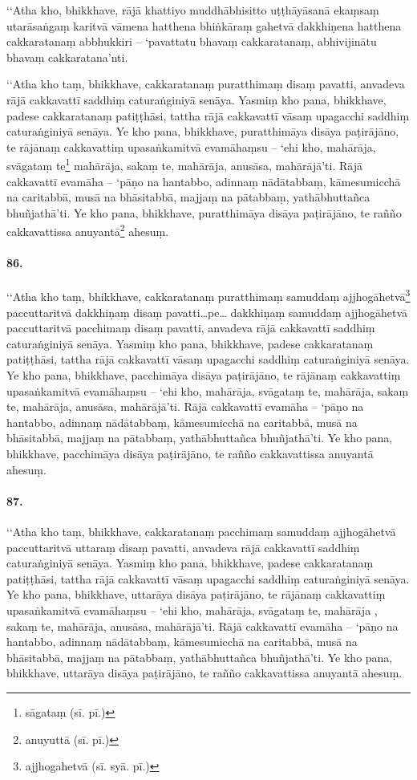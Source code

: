‘‘Atha kho, bhikkhave, rājā khattiyo muddhābhisitto uṭṭhāyāsanā ekaṃsaṃ utarāsaṅgaṃ karitvā vāmena hatthena bhiṅkāraṃ gahetvā dakkhiṇena hatthena cakkaratanaṃ abbhukkiri – ‘pavattatu bhavaṃ cakkaratanaṃ, abhivijinātu bhavaṃ cakkaratana’nti.

‘‘Atha kho taṃ, bhikkhave, cakkaratanaṃ puratthimaṃ disaṃ pavatti, anvadeva rājā cakkavattī saddhiṃ caturaṅginiyā senāya. Yasmiṃ kho pana, bhikkhave, padese cakkaratanaṃ patiṭṭhāsi, tattha rājā cakkavattī vāsaṃ upagacchi saddhiṃ caturaṅginiyā senāya. Ye kho pana, bhikkhave, puratthimāya disāya paṭirājāno, te rājānaṃ cakkavattiṃ upasaṅkamitvā evamāhaṃsu – ‘ehi kho, mahārāja, svāgataṃ te\footnote{sāgataṃ (sī. pī.)} mahārāja, sakaṃ te, mahārāja, anusāsa, mahārājā’ti. Rājā cakkavattī evamāha – ‘pāṇo na hantabbo, adinnaṃ nādātabbaṃ, kāmesumicchā na caritabbā, musā na bhāsitabbā, majjaṃ na pātabbaṃ, yathābhuttañca bhuñjathā’ti. Ye kho pana, bhikkhave, puratthimāya disāya paṭirājāno, te rañño cakkavattissa anuyantā\footnote{anuyuttā (sī. pī.)} ahesuṃ.

\paragraph{86.} ‘‘Atha kho taṃ, bhikkhave, cakkaratanaṃ puratthimaṃ samuddaṃ ajjhogāhetvā\footnote{ajjhogahetvā (sī. syā. pī.)} paccuttaritvā dakkhiṇaṃ disaṃ pavatti…pe… dakkhiṇaṃ samuddaṃ ajjhogāhetvā paccuttaritvā pacchimaṃ disaṃ pavatti, anvadeva rājā cakkavattī saddhiṃ caturaṅginiyā senāya. Yasmiṃ kho pana, bhikkhave, padese cakkaratanaṃ patiṭṭhāsi, tattha rājā cakkavattī vāsaṃ upagacchi saddhiṃ caturaṅginiyā senāya. Ye kho pana, bhikkhave, pacchimāya disāya paṭirājāno, te rājānaṃ cakkavattiṃ upasaṅkamitvā evamāhaṃsu – ‘ehi kho, mahārāja, svāgataṃ te, mahārāja, sakaṃ te, mahārāja, anusāsa, mahārājā’ti. Rājā cakkavattī evamāha – ‘pāṇo na hantabbo, adinnaṃ nādātabbaṃ, kāmesumicchā na caritabbā, musā na bhāsitabbā, majjaṃ na pātabbaṃ, yathābhuttañca bhuñjathā’ti. Ye kho pana, bhikkhave, pacchimāya disāya paṭirājāno, te rañño cakkavattissa anuyantā ahesuṃ.

\paragraph{87.} ‘‘Atha kho taṃ, bhikkhave, cakkaratanaṃ pacchimaṃ samuddaṃ ajjhogāhetvā paccuttaritvā uttaraṃ disaṃ pavatti, anvadeva rājā cakkavattī saddhiṃ caturaṅginiyā senāya. Yasmiṃ kho pana, bhikkhave, padese cakkaratanaṃ patiṭṭhāsi, tattha rājā cakkavattī vāsaṃ upagacchi saddhiṃ caturaṅginiyā senāya. Ye kho pana, bhikkhave, uttarāya disāya paṭirājāno, te rājānaṃ cakkavattiṃ upasaṅkamitvā evamāhaṃsu – ‘ehi kho, mahārāja, svāgataṃ te, mahārāja , sakaṃ te, mahārāja, anusāsa, mahārājā’ti. Rājā cakkavattī evamāha – ‘pāṇo na hantabbo, adinnaṃ nādātabbaṃ, kāmesumicchā na caritabbā, musā na bhāsitabbā, majjaṃ na pātabbaṃ, yathābhuttañca bhuñjathā’ti. Ye kho pana, bhikkhave, uttarāya disāya paṭirājāno, te rañño cakkavattissa anuyantā ahesuṃ.

